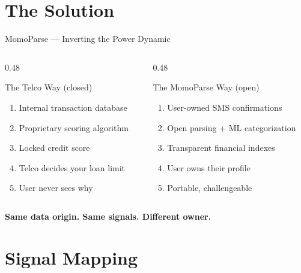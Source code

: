 \documentclass[aspectratio=169, 11pt]{beamer}
\begin{document}
\section{The Solution}

\begin{frame}{MomoParse --- Inverting the Power Dynamic}
\begin{columns}[T]
\begin{column}{0.48\textwidth}
\begin{block}{The Telco Way (closed)}
\begin{enumerate}
  \item Internal transaction database
  \item Proprietary scoring algorithm
  \item Locked credit score
  \item Telco decides your loan limit
  \item \textcolor{mpRed}{User never sees why}
\end{enumerate}
\end{block}
\end{column}
\begin{column}{0.48\textwidth}
\begin{block}{The MomoParse Way (open)}
\begin{enumerate}
  \item User-owned SMS confirmations
  \item Open parsing + ML categorization
  \item Transparent financial indexes
  \item User owns their profile
  \item \textcolor{mpTeal}{Portable, challengeable}
\end{enumerate}
\end{block}
\end{column}
\end{columns}

\vspace{0.5cm}
\centering
\textbf{Same data origin. Same signals. Different owner.}
\end{frame}

\section{Signal Mapping}
\end{document}
